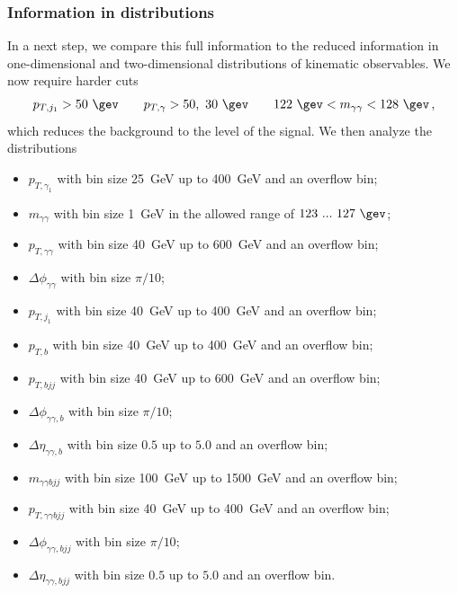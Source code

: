 \subsubsection*{Information in distributions}

In a next step, we compare this full information to the reduced
information in one-dimensional and two-dimensional distributions of
kinematic observables. We now require harder cuts
%
\begin{align}
  p_{T,j_1} > 50~\gev \qquad 
  p_{T,\gamma} > 50,~30~\gev \qquad
  122~\gev < m_{\gamma \gamma} < 128~\gev \,,
  \label{eq:th_cuts}
\end{align}
%
which reduces the background to the level of the signal. We then
analyze the distributions~\cite{top_higgs,Kling:2012up}
%
\begin{itemize}[label=\raisebox{0.1ex}{\scriptsize$\bullet$}]
\item $p_{T,\gamma_1}$ with bin size 25~GeV up to 400~GeV and an
  overflow bin;
\item $m_{\gamma\gamma}$ with bin size 1~GeV in the allowed range of
  $123~...~127~\gev$;
\item $p_{T,\gamma \gamma}$ with bin size 40~GeV up to 600~GeV and an
  overflow bin;
\item $\Delta \phi_{\gamma \gamma}$ with bin size $\pi/10$;  
\item $p_{T,j_1}$ with bin size 40~GeV up to 400~GeV and an
  overflow bin;
\item $p_{T,b}$ with bin size 40~GeV up to 400~GeV and an
  overflow bin;
\item $p_{T,bjj}$ with bin size 40~GeV up to 600~GeV and an
  overflow bin;
\item $\Delta \phi_{\gamma \gamma, b}$ with bin size $\pi / 10$;
\item $\Delta \eta_{\gamma\gamma, b}$ with bin size $0.5$ up to $5.0$ and an
  overflow bin;
\item $m_{\gamma \gamma bjj}$ with bin size 100~GeV up to 1500~GeV and an
  overflow bin;
\item $p_{T,\gamma \gamma bjj}$ with bin size 40~GeV up to 400~GeV and an
  overflow bin;
\item $\Delta \phi_{\gamma \gamma, bjj}$ with bin size $\pi / 10$;
\item $\Delta \eta_{\gamma\gamma, bjj}$ with bin size $0.5$ up to $5.0$ and an
  overflow bin.
\end{itemize}\bigskip 

